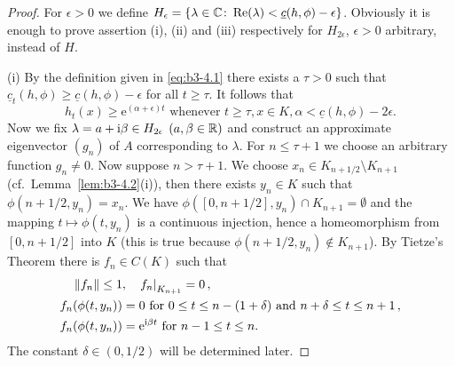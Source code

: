 \begin{proof}
	For $\epsilon > 0$ we define $H_{\epsilon} = \{\lambda \in \mathbb{C} \colon \mathop{}\!\mathrm{Re}(\lambda) < \underline{c}(h,\phi)-\epsilon\}$.
	Obviously it is enough to prove assertion (i), (ii) and (iii) respectively for $H_{2\epsilon}$, $\epsilon> 0$ arbitrary, instead of $H$.

	(i) By the definition given in \eqref{eq:b3-4.1} there exists a $\tau > 0$ such that $\underline{c}_{t}(h,\phi) \geq \underline{c}(h,\phi) - \epsilon$ for all $t \geq \tau$.
	It follows that
	\begin{equation}\label{eq:b3-4.5}
		h_{t}(x) \geq \mathrm{e}^{(\alpha + \epsilon)t} \text{ whenever } t \geq \tau, x \in K, \alpha < \underline{c}(h,\phi)-2\epsilon .
	\end{equation}
	Now we fix $\lambda = a + \mathrm{i}\beta \in H_{2\epsilon}$ $(a,\beta \in \mathbb{R})$ and construct an approximate eigenvector $(g_{n})$ of $A$ corresponding to $\lambda$.
	For $n \leq \tau + 1$ we choose an arbitrary function $g_{n} \neq 0$.
	Now suppose $n > \tau + 1$.
	We choose $x_{n} \in K_{n+1/2} \setminus K_{n+1}$ (cf.\ Lemma~\ref{lem:b3-4.2}(i)), then there exists $y_{n} \in K$ such that $\phi(n+1/2,y_{n}) = x_{n}$.
	We have $\phi([0,n+1/2],y_{n}) \cap K_{n+1} = \emptyset$ and the mapping $t \mapsto \phi(t,y_{n})$ is a continuous injection, hence a homeomorphism from $[0,n+1/2]$ into $K$ (this is true because $\phi(n+1/2,y_{n}) \notin K_{n+1}$).
	By Tietze's Theorem there is $f_{n} \in C(K)$ such that
	\begin{equation}\label{eq:b3-4.6}
		\begin{aligned}
			\|f_{n}\| \leq 1 &, \quad {f_{n}|}_{K_{n+1}} = 0\,, \\
			f_{n}(\phi(t,y_{n})) &= 0 \text{ for } 0 \leq t \leq n-(1+\delta) \text{ and } n+\delta \leq t \leq n+1\,, \\
			f_{n}(\phi(t,y_{n})) &= \mathrm{e}^{\mathrm{i}\beta  t} \text{ for } n-1 \leq t \leq n .
		\end{aligned}
	\end{equation}
	The constant $\delta \in (0,1/2)$ will be determined later.
	

\end{proof}
